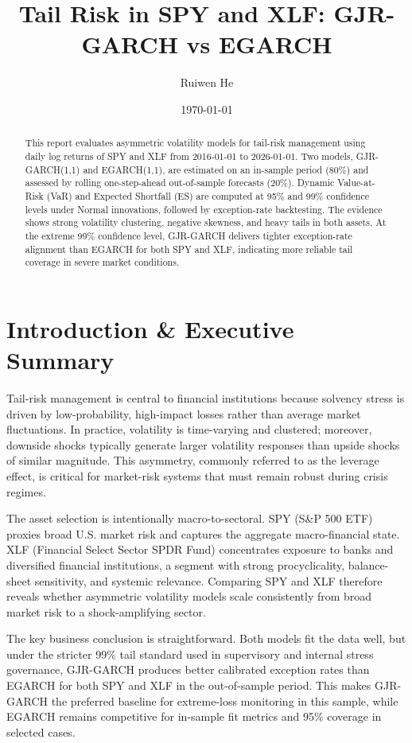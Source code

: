 \documentclass[12pt]{article}
\title{Tail Risk in SPY and XLF: GJR-GARCH vs EGARCH}
\author{Ruiwen He}
\date{\today}
\begin{document}
\maketitle

\begin{abstract}
This report evaluates asymmetric volatility models for tail-risk management using daily log returns of SPY and XLF from 2016-01-01 to 2026-01-01. Two models, GJR-GARCH(1,1) and EGARCH(1,1), are estimated on an in-sample period (80\%) and assessed by rolling one-step-ahead out-of-sample forecasts (20\%). Dynamic Value-at-Risk (VaR) and Expected Shortfall (ES) are computed at 95\% and 99\% confidence levels under Normal innovations, followed by exception-rate backtesting. The evidence shows strong volatility clustering, negative skewness, and heavy tails in both assets. At the extreme 99\% confidence level, GJR-GARCH delivers tighter exception-rate alignment than EGARCH for both SPY and XLF, indicating more reliable tail coverage in severe market conditions.\end{abstract}

\section{Introduction \& Executive Summary}
Tail-risk management is central to financial institutions because solvency stress is driven by low-probability, high-impact losses rather than average market fluctuations. In practice, volatility is time-varying and clustered; moreover, downside shocks typically generate larger volatility responses than upside shocks of similar magnitude. This asymmetry, commonly referred to as the leverage effect, is critical for market-risk systems that must remain robust during crisis regimes.

The asset selection is intentionally macro-to-sectoral. SPY (S\&P 500 ETF) proxies broad U.S. market risk and captures the aggregate macro-financial state. XLF (Financial Select Sector SPDR Fund) concentrates exposure to banks and diversified financial institutions, a segment with strong procyclicality, balance-sheet sensitivity, and systemic relevance. Comparing SPY and XLF therefore reveals whether asymmetric volatility models scale consistently from broad market risk to a shock-amplifying sector.

The key business conclusion is straightforward. Both models fit the data well, but under the stricter 99\% tail standard used in supervisory and internal stress governance, GJR-GARCH produces better calibrated exception rates than EGARCH for both SPY and XLF in the out-of-sample period. This makes GJR-GARCH the preferred baseline for extreme-loss monitoring in this sample, while EGARCH remains competitive for in-sample fit metrics and 95\% coverage in selected cases.
\end{document}
